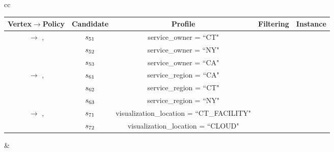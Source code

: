 \begin{example}[\bf \pipelineInstance]
\begin{table*}
{\begin{tabular}[t]{cc}
\begin{tabular}{c|c|c|c|c}
        \textbf{Vertex$\rightarrow$Policy}                   & \textbf{Candidate} & \textbf{Profile}                         & \textbf{Filtering} & \textbf{Instance} \\\hline
        \multirow{ 3}{*}{\vi{5}  $\rightarrow$ \p{1},\p{2} } & $s_{51}$           & service\_owner =    ``CT"                 & \cmark             & \cmark            \\
                                                              & $s_{52}$           & service\_owner =    ``NY"                 & \cmark             & \xmark            \\
                                                              & $s_{53}$           & service\_owner =   ``CA"                 & \xmark             & \xmark            \\
        \hline
        \multirow{ 3}{*}{\vi{6}  $\rightarrow$ \p{3},\p{4} } & $s_{61}$           & service\_region =    ``CA"                & \xmark             & \xmark            \\
                                                              & $s_{62}$           & service\_region =    ``CT"                & \cmark             & \cmark            \\
                                                              & $s_{63}$           & service\_region =    ``NY"                & \cmark             & \xmark            \\
        \hline
        \multirow{ 3}{*}{\vi{7}  $\rightarrow$ \p{5},\p{6} } & $s_{71}$           & visualization\_location = ``CT\_FACILITY" & \cmark             & \cmark            \\
                                                              & $s_{72}$           & visualization\_location = ``CLOUD"        & \cmark             & \xmark            \\
      \end{tabular}
                                  &

      \begin{tabular}{c|c}\label{tab:instance_example_maxquality}


\end{tabular}
\end{tabular}}
\end{table*}
\end{example}
